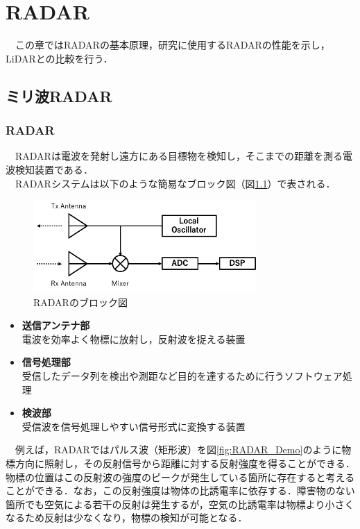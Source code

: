 \chapter{RADAR}
　この章ではRADARの基本原理，研究に使用するRADARの性能を示し，LiDARとの比較を行う．

\section{ミリ波RADAR}
\subsection{RADAR}
　RADARは電波を発射し遠方にある目標物を検知し，そこまでの距離を測る電波検知装置である\cite{RADAR_book}．\\
　RADARシステムは以下のような簡易なブロック図（図\ref{fig:RADAR_Block}）で表される．

\begin{figure}[H]
    \centering
    \includegraphics[width=8.5cm]{./fig/RADAR_Block.png}
    \caption{RADARのブロック図}
    \label{fig:RADAR_Block}
\end{figure}

\begin{itemize}
    \item \textbf{送信アンテナ部}\\
        電波を効率よく物標に放射し，反射波を捉える装置
    \item \textbf{信号処理部}\\
        受信したデータ列を検出や測距など目的を達するために行うソフトウェア処理
    \item \textbf{検波部}\\
        受信波を信号処理しやすい信号形式に変換する装置
\end{itemize}

　例えば，RADARではパルス波（矩形波）を図\ref{fig:RADAR_Demo}のように物標方向に照射し，その反射信号から距離に対する反射強度を得ることができる．物標の位置はこの反射波の強度のピークが発生している箇所に存在すると考えることができる．なお，この反射強度は物体の比誘電率に依存する．障害物のない箇所でも空気による若干の反射は発生するが，空気の比誘電率は物標より小さくなるため反射は少なくなり，物標の検知が可能となる．

